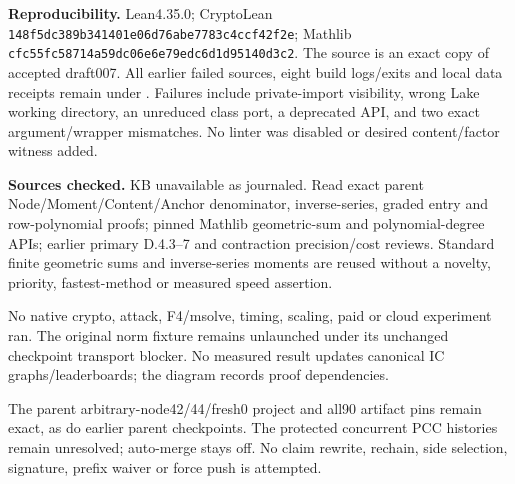 \documentclass[10pt]{article}
\begin{document}
\textbf{Reproducibility.} Lean4.35.0; CryptoLean
\texttt{148f5dc389b341401e06d76abe7783c4ccf42f2e}; Mathlib
\texttt{cfc55fc58714a59dc06e6e79edc6d1d95140d3c2}.
The source is an exact copy of accepted draft007. All earlier failed sources,
eight build logs/exits and local data receipts remain under
. Failures include private-import visibility,
wrong Lake working directory, an unreduced class port, a deprecated API,
and two exact argument/wrapper mismatches. No linter was disabled or desired
content/factor witness added.

\textbf{Sources checked.} KB unavailable as journaled. Read exact parent
Node/Moment/Content/Anchor denominator, inverse-series, graded entry and
row-polynomial proofs; pinned Mathlib geometric-sum and polynomial-degree
APIs; earlier primary D.4.3--7 and contraction precision/cost reviews.
Standard finite geometric sums and inverse-series moments are reused without
a novelty, priority, fastest-method or measured speed assertion.

No native crypto, attack, F4/msolve, timing, scaling, paid or cloud experiment
ran. The original norm fixture remains unlaunched under its unchanged
checkpoint transport blocker. No measured result updates canonical IC
graphs/leaderboards; the diagram records proof dependencies.

The parent arbitrary-node42/44/fresh0 project and all90 artifact pins remain
exact, as do earlier parent checkpoints. The protected concurrent PCC
histories remain unresolved; auto-merge stays off. No claim rewrite,
rechain, side selection, signature, prefix waiver or force push is attempted.
\end{document}
